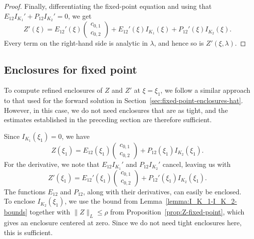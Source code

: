 \documentclass[11pt]{article}
\begin{document}
\begin{proof}
  Finally, differentiating the fixed-point equation and using that
  \(E_{12}I_{K_{1}}' + P_{12}I_{K_{2}}' = 0\), we get
  \begin{equation*}
    Z'(\xi)
    = E_{12}'(\xi)\begin{pmatrix} c_{0,1} \\ c_{0,2} \end{pmatrix}
    + E_{12}'(\xi)I_{K_{1}}(\xi) + P_{12}'(\xi)I_{K_{2}}(\xi).
  \end{equation*}
  Every term on the right-hand side is analytic in \(\lambda\), and
  hence so is \(Z'(\xi, \lambda)\).
\end{proof}

\subsection{Enclosures for fixed point}
\label{sec:fixed-point-enclosures-Z}

To compute refined enclosures of \(Z\) and \(Z'\) at
\(\xi = \xi_{1}\), we follow a similar approach to that used for the
forward solution in Section~\ref{sec:fixed-point-enclosures-hat}.
However, in this case, we do not need enclosures that are as tight,
and the estimates established in the preceding section are therefore
sufficient.

Since \(I_{K_{1}}(\xi_{1}) = 0\), we have
\begin{equation*}
  Z(\xi_{1}) = E_{12}(\xi_{1})\begin{pmatrix} c_{0,1} \\ c_{0,2} \end{pmatrix}
  + P_{12}(\xi_{1})I_{K_{2}}(\xi_{1}).
\end{equation*}
For the derivative, we note that \(E_{12}I_{K_{1}}'\) and
\(P_{12}I_{K_{2}}'\) cancel, leaving us with
\begin{equation*}
  Z'(\xi_{1})
  = E_{12}'(\xi_{1})\begin{pmatrix} c_{0,1} \\ c_{0,2} \end{pmatrix}
  + P_{12}'(\xi_{1})I_{K_{2}}(\xi_{1}).
\end{equation*}
The functions \(E_{12}\) and \(P_{12}\), along with their derivatives,
can easily be enclosed. To enclose \(I_{K_{2}}(\xi_{1})\), we use the
bound from Lemma~\ref{lemma:I_K_1-I_K_2-bounds} together with
\(\|Z\|_{L} \leq \rho\) from Proposition~\ref{prop:Z-fixed-point},
which gives an enclosure centered at zero. Since we do not need tight
enclosures here, this is sufficient.
\end{document}
